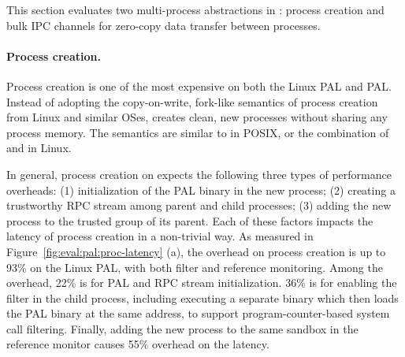 \label{sec:eval:pal:multi-proc}

This section evaluates two multi-process abstractions in \thehostabi:
process creation and bulk IPC channels for zero-copy data transfer between processes.



\paragraph{Process creation.}
Process creation is one of the most expensive
\hostapis{} on both the Linux PAL and \sgx{} PAL.
Instead of adopting the copy-on-write, fork-like semantics
of process creation
from Linux and similar OSes,
\thehostabi{}
creates clean, new processes
without sharing
any process memory.
The semantics
are similar to  in POSIX, or the combination
of  and  in Linux.



In general, process creation on \thehostabi{}
expects the following three types of performance overheads:
(1) initialization of the PAL binary in the new process;
(2) creating a trustworthy RPC stream among parent and child processes;
(3) adding the new process to the trusted group of its parent.
Each of these factors
impacts the latency of process creation
in a non-trivial way.
As measured in
Figure~\ref{fig:eval:pal:proc-latency} (a),
the overhead on process creation
is up to 93\% on the Linux PAL,
with both \seccomp{} filter and reference monitoring.
Among the overhead,
22\% is for PAL and RPC stream initialization.
36\% is for enabling the \seccomp{} filter
in the child process,
including executing a separate binary
which then loads the PAL binary at the same address,
to support program-counter-based system call filtering.
Finally,
adding the new process to the same sandbox
in the reference monitor
causes 55\% overhead on the latency.






